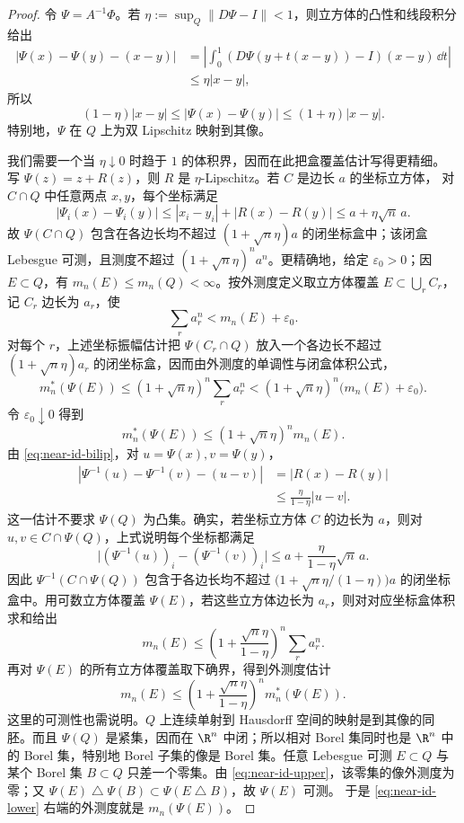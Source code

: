 \begin{proof}
令 $\Psi=A^{-1}\Phi$。若
$\eta:=\sup_Q\|D\Psi-I\|<1$，则立方体的凸性和线段积分给出
\[
 \begin{aligned}
 |\Psi(x)-\Psi(y)-(x-y)|
 &=\left|\int_0^1(D\Psi(y+t(x-y))-I)(x-y)\,\dd t\right|\\
 &\le\eta|x-y|,
 \end{aligned}
\]
所以
\[
 (1-\eta)|x-y|\le|\Psi(x)-\Psi(y)|\le(1+\eta)|x-y|.
 \tag{3.2.9}\label{eq:near-id-bilip}
\]
特别地，$\Psi$ 在 $Q$ 上为双 Lipschitz 映射到其像。

我们需要一个当 $\eta\downarrow0$ 时趋于 $1$ 的体积界，因而在此把盒覆盖估计写得更精细。
写 $\Psi(z)=z+R(z)$，则 $R$ 是 $\eta$-Lipschitz。若 $C$ 是边长 $a$ 的坐标立方体，
对 $C\cap Q$ 中任意两点 $x,y$，每个坐标满足
\[
 |\Psi_i(x)-\Psi_i(y)|
 \le |x_i-y_i|+|R(x)-R(y)|
 \le a+\eta\sqrt n\,a.
\]
故 $\Psi(C\cap Q)$ 包含在各边长均不超过 $(1+\sqrt n\eta)a$ 的闭坐标盒中；该闭盒
Lebesgue 可测，且测度不超过 $(1+\sqrt n\eta)^na^n$。更精确地，给定
$\varepsilon_0>0$；因 $E\subset Q$，有 $m_n(E)\le m_n(Q)<\infty$。按外测度定义取立方体覆盖
$E\subset\bigcup_r C_r$，记 $C_r$ 边长为 $a_r$，使
\[
 \sum_r a_r^n<m_n(E)+\varepsilon_0.
\]
对每个 $r$，上述坐标振幅估计把 $\Psi(C_r\cap Q)$ 放入一个各边长不超过
$(1+\sqrt n\eta)a_r$ 的闭坐标盒，因而由外测度的单调性与闭盒体积公式，
\[
 m_n^*(\Psi(E))
 \le (1+\sqrt n\eta)^n\sum_r a_r^n
 <(1+\sqrt n\eta)^n\bigl(m_n(E)+\varepsilon_0\bigr).
\]
令 $\varepsilon_0\downarrow0$ 得到
\[
 m_n^*(\Psi(E))\le(1+\sqrt n\eta)^n m_n(E).
 \tag{3.2.10}\label{eq:near-id-upper}
\]
由 \eqref{eq:near-id-bilip}，对 $u=\Psi(x),v=\Psi(y)$，
\[
 \begin{aligned}
 |\Psi^{-1}(u)-\Psi^{-1}(v)-(u-v)|
 &=|R(x)-R(y)|\\
 &\le \frac{\eta}{1-\eta}|u-v|.
 \end{aligned}
\]
这一估计不要求 $\Psi(Q)$ 为凸集。确实，若坐标立方体 $C$ 的边长为 $a$，则对
$u,v\in C\cap\Psi(Q)$，上式说明每个坐标都满足
\[
 \bigl|(\Psi^{-1}(u))_i-(\Psi^{-1}(v))_i\bigr|
 \le a+\frac{\eta}{1-\eta}\sqrt n\,a.
\]
因此 $\Psi^{-1}(C\cap\Psi(Q))$ 包含于各边长均不超过
$\bigl(1+\sqrt n\eta/(1-\eta)\bigr)a$ 的闭坐标盒中。用可数立方体覆盖
$\Psi(E)$，若这些立方体边长为 $a_r$，则对对应坐标盒体积求和给出
\[
 m_n(E)
 \le \left(1+\frac{\sqrt n\eta}{1-\eta}\right)^n\sum_r a_r^n.
\]
再对 $\Psi(E)$ 的所有立方体覆盖取下确界，得到外测度估计
\[
 m_n(E)\le
 \left(1+\frac{\sqrt n\eta}{1-\eta}\right)^n m_n^*(\Psi(E)).
 \tag{3.2.11}\label{eq:near-id-lower}
\]
这里的可测性也需说明。$Q$ 上连续单射到 Hausdorff 空间的映射是到其像的同胚。而且
$\Psi(Q)$ 是紧集，因而在 $\R^n$ 中闭；所以相对 Borel 集同时也是 $\R^n$ 中的
Borel 集，特别地 Borel 子集的像是 Borel 集。任意 Lebesgue 可测 $E\subset Q$ 与某个
Borel 集 $B\subset Q$ 只差一个零集。由
\eqref{eq:near-id-upper}，该零集的像外测度为零；又
$\Psi(E)\mathbin\triangle\Psi(B)\subset\Psi(E\mathbin\triangle B)$，故 $\Psi(E)$ 可测。
于是 \eqref{eq:near-id-lower} 右端的外测度就是 $m_n(\Psi(E))$。


\end{proof}
